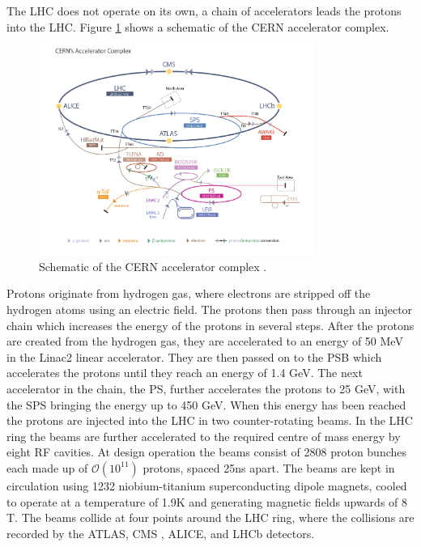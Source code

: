 The \ac{LHC} does not operate on its own, a chain of accelerators leads
the protons into the \ac{LHC}. Figure \ref{fig:lhc_schematic} shows a schematic
of the \ac{CERN} accelerator complex.
\begin{figure}[h!]
\includegraphics[width=0.8\textwidth]{./Detector/Plots/LHC_default.jpg}
\caption{Schematic of the \ac{CERN} accelerator complex \cite{lhc-schematic}.}
\label{fig:lhc_schematic}
\end{figure}
Protons originate from hydrogen gas, where electrons are stripped off the 
hydrogen atoms using an electric field. The protons then pass through an injector
chain which increases the energy of the protons in several steps. After the protons
are created from the hydrogen gas, they are accelerated to an energy of
50 MeV in the Linac2 linear accelerator. They are then passed on to the
\acf{PSB} which accelerates the protons until they reach an energy of 1.4 GeV.
The next accelerator in the chain, the \acf{PS}, further accelerates the protons to 25 GeV,
with the \acf{SPS} bringing the energy up to 450 GeV. When this energy has been 
reached the protons are injected into the \ac{LHC} in two counter-rotating
beams. In the \ac{LHC} ring the beams are further accelerated to the required centre of mass energy
by eight \ac{RF} cavities. At design operation the beams consist of 2808 proton bunches each made up 
of $\mathcal{O}(10^{11})$ protons, spaced 25ns apart. The beams are kept in circulation
using 1232 niobium-titanium superconducting dipole magnets, cooled to operate at 
a temperature of 1.9K and generating magnetic fields upwards of 8 T.
The beams collide at four points
around the \ac{LHC} ring, where the collisions are recorded by the ATLAS\cite{atlas-jinst}, 
CMS%
, ALICE\cite{alice-jinst}, and LHCb\cite{lhcb-jinst} detectors.

